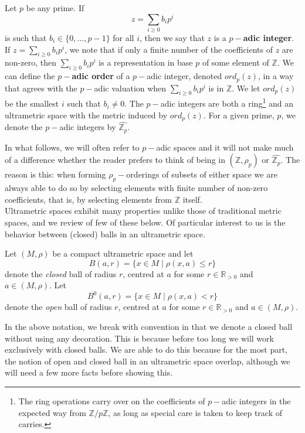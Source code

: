 \begin{example}
Let $p$ be any prime. If 
\[z = \sum_{i \geq 0} b_ip^i\]
is such that $b_i \in \{0,\ldots,p-1\}$ for all $i$, then we say that $z$ is a \textbf{$p-$adic integer}. If $z = \sum_{i \geq 0} b_ip^i$, we note that if only a finite number of the coefficients of $z$ are non-zero, then $\sum_{i \geq 0} b_ip^i$ is a representation in base $p$ of some element of $\mathbb{Z}$. We can define the \textbf{$p-$adic order} of a $p-$adic integer, denoted $ord_p(z)$, in a way that agrees with the $p-$adic valuation when $\sum_{i \geq 0} b_ip^i$ is in $\mathbb{Z}$. We let $ord_p(z)$ be the smallest $i$ such that $b_i \neq 0$. The $p-$adic integers are both a ring\footnote{The ring operations carry over on the coefficients of $p-$adic integers in the expected way from $\mathbb{Z}/p\mathbb{Z}$, as long as special care is taken to keep track of carries.} and an ultrametric space with the metric induced by $ord_p(z)$. For a given prime, $p$, we denote the $p-$adic integers by $\widehat{\mathbb{Z}_p}$.
\end{example} 

In what follows, we will often refer to $p-$adic spaces and it will not make much of a difference whether the reader prefers to think of being in $(\mathbb{Z}, \rho_p)$ or $\widehat{\mathbb{Z}_p}$. The reason is this: when forming $\rho_p-$orderings of subsets of either space we are always able to do so by selecting elements with finite number of non-zero coefficients, that is, by selecting elements from $\mathbb{Z}$ itself. \\

Ultrametric spaces exhibit many properties unlike those of traditional metric spaces, and we review of few of these below. Of particular interest to us is the behavior between (closed) balls in an ultrametric space. \\

\begin{notation*}
	Let $(M, \rho)$ be a compact ultrametric space and let \[B(a, r)=\{x \in M \mid \rho(x,a) \leq r\}\] denote the \textit{closed} ball of radius $r$, centred at $a$ for some $r \in \mathbb{R}_{> 0}$ and $a \in (M,\rho)$. Let \[B^0(a, r)=\{x \in M \mid \rho(x,a) < r\}\] denote the \textit{open} ball of radius $r$, centred at $a$ for some $r \in \mathbb{R}_{> 0}$ and $a \in (M,\rho)$.
\end{notation*} 


In the above notation, we break with  convention in that we denote a closed ball without using any decoration. This is because before too long we will work exclusively with closed balls.  We are able to do this because for the most part, the notion of open and closed ball in an ultrametric space overlap, although we will need a few more facts before showing this.\\

